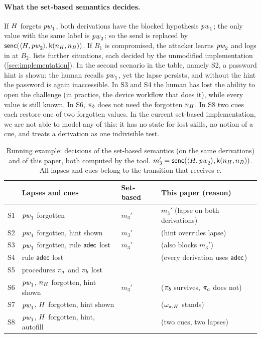 \paragraph{What the set-based semantics decides.} If $H$ forgets $\mathit{pw}_1$, both derivations have the blocked hypothesis $\mathit{pw}_1$; the only value with the same label is $\mathit{pw}_2$; so the send is replaced by $\mathsf{senc}(\langle H,\mathit{pw}_2\rangle,\mathsf{k}(n_H,n_B))$. If $B_1$ is compromised, the attacker learns $\mathit{pw}_2$ and logs in at $B_2$.  lists further situations, each decided by the unmodified implementation (\cref{sec:implementation}). In the second scenario in the table, namely S2, a password hint is shown: the human recalls $\mathit{pw}_1$, yet the lapse persists, and without the hint the password is again inaccessible. In S3 and S4 the human has lost the ability to open the challenge (in practice, the device workflow that does it), while every value is still known. In S6, $\pi_b$ does not need the forgotten $n_H$. In S8 two cues each restore one of two forgotten values. In the current set-based implementation, we are not able to model any of this: it has no state for lost skills, no notion of a cue, and treats a derivation as one indivisible test.

\begin{table}[t]
\centering\scriptsize
\caption{Running example: decisions of the set-based semantics (on the same derivations) and of this paper, both computed by the tool. $m_3' = \mathsf{senc}(\langle H,\mathit{pw}_2\rangle,\mathsf{k}(n_H,n_B))$. All lapses and cues belong to the transition that receives $c$.}
\label{tab:running}
\setlength{\tabcolsep}{3pt}
\begin{tabular}{@{}llll@{}}
\toprule
 & Lapses and cues & Set-based & This paper (reason) \\
\midrule
S1 & $\mathit{pw}_1$ forgotten & \replace{} $m_3'$ & \replace{} $m_3'$ (lapse on both derivations) \\
S2 & $\mathit{pw}_1$ forgotten, hint shown & \replace{} $m_3'$ & \preserve{} (hint overrules lapse) \\
S3 & $\mathit{pw}_1$ forgotten, rule $\mathsf{adec}$ lost & \replace{} $m_3'$ & \skipm{} (also blocks $m_3'$) \\
S4 & rule $\mathsf{adec}$ lost & \preserve{} & \skipm{} (every derivation uses $\mathsf{adec}$) \\
S5 & procedures $\pi_a$ and $\pi_b$ lost & \preserve{} & \skipm{} \\
S6 & $\mathit{pw}_1$, $n_H$ forgotten, hint shown & \replace{} $m_3'$ & \preserve{} ($\pi_b$ survives, $\pi_a$ does not) \\
S7 & $\mathit{pw}_1$, $H$ forgotten, hint shown & \skipm{} & \skipm{} ($\omega_{\pi,H}$ stands) \\
S8 & $\mathit{pw}_1$, $H$ forgotten, hint, autofill & \skipm{} & \preserve{} (two cues, two lapses) \\
\bottomrule
\end{tabular}
\end{table}

